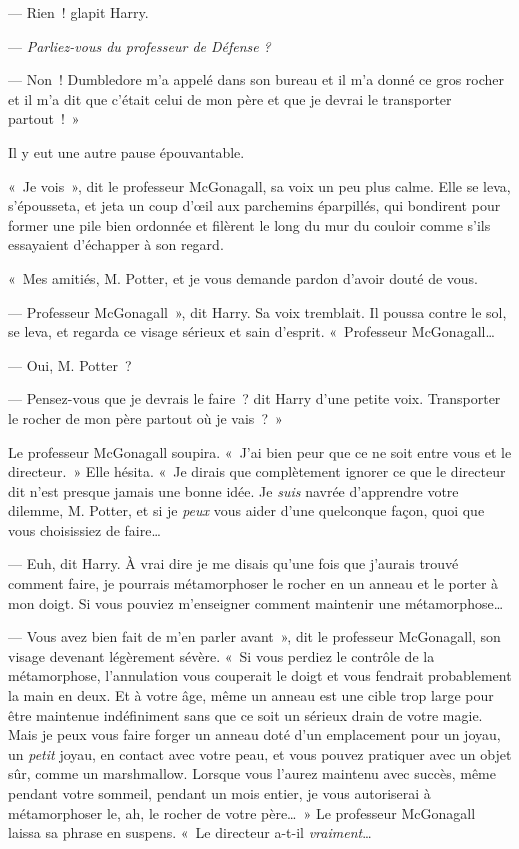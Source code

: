 --- Rien~! glapit Harry.

--- \emph{Parliez-vous du professeur de Défense} \emph{?}

--- Non~!
Dumbledore m'a appelé dans son bureau et il m'a donné ce gros rocher et il m'a dit que c'était celui de mon père et que je devrai le transporter partout~!~»

Il y eut une autre pause épouvantable.

«~Je vois~», dit le professeur McGonagall, sa voix un peu plus calme.
Elle se leva, s'épousseta, et jeta un coup d'œil aux parchemins éparpillés, qui bondirent pour former une pile bien ordonnée et filèrent le long du mur du couloir comme s'ils essayaient d'échapper à son regard.

«~Mes amitiés, M. Potter, et je vous demande pardon d'avoir douté de vous.

--- Professeur McGonagall~», dit Harry.
Sa voix tremblait.
Il poussa contre le sol, se leva, et regarda ce visage sérieux et sain d'esprit.
«~Professeur McGonagall…

--- Oui, M. Potter~?

--- Pensez-vous que je devrais le faire~? dit Harry d'une petite voix.
Transporter le rocher de mon père partout où je vais~?~»

Le professeur McGonagall soupira.
«~J'ai bien peur que ce ne soit entre vous et le directeur.~»
Elle hésita.
«~Je dirais que complètement ignorer ce que le directeur dit n'est presque jamais une bonne idée.
Je \emph{suis} navrée d'apprendre votre dilemme, M. Potter, et si je \emph{peux} vous aider d'une quelconque façon, quoi que vous choisissiez de faire…

--- Euh, dit Harry.
À vrai dire je me disais qu'une fois que j'aurais trouvé comment faire, je pourrais métamorphoser le rocher en un anneau et le porter à mon doigt.
Si vous pouviez m'enseigner comment maintenir une métamorphose…

--- Vous avez bien fait de m'en parler avant~», dit le professeur McGonagall, son visage devenant légèrement sévère.
«~Si vous perdiez le contrôle de la métamorphose, l'annulation vous couperait le doigt et vous fendrait probablement la main en deux.
Et à votre âge, même un anneau est une cible trop large pour être maintenue indéfiniment sans que ce soit un sérieux drain de votre magie.
Mais je peux vous faire forger un anneau doté d'un emplacement pour un joyau, un \emph{petit} joyau, en contact avec votre peau, et vous pouvez pratiquer avec un objet sûr, comme un marshmallow.
Lorsque vous l'aurez maintenu avec succès, même pendant votre sommeil, pendant un mois entier, je vous autoriserai à métamorphoser le, ah, le rocher de votre père…~»
Le professeur McGonagall laissa sa phrase en suspens.
«~Le directeur a-t-il \emph{vraiment}…

